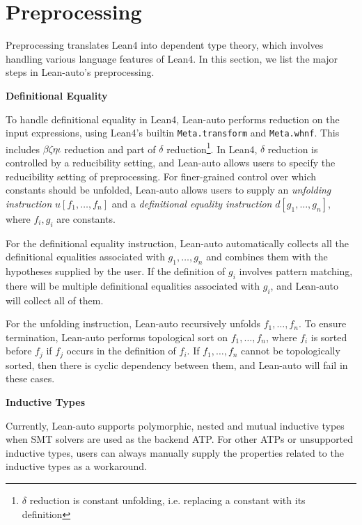\section{Preprocessing}\label{sectprep}

  Preprocessing translates Lean4 into dependent type theory, which involves
  handling various language features of Lean4. In this section, we list the major steps
  in Lean-auto's preprocessing.


\noindent \textbf{Definitional Equality}

  To handle definitional equality in Lean4, Lean-auto performs reduction on the input
  expressions, using Lean4's builtin \texttt{Meta.transform} and \texttt{Meta.whnf}.
  This includes $\beta \zeta \eta \iota$ reduction and part of $\delta$
  reduction\footnote{$\delta$ reduction is constant unfolding, i.e. replacing a constant with its definition}.
  In Lean4, $\delta$ reduction is controlled by a reducibility setting,
  and Lean-auto allows users to specify the reducibility setting of preprocessing.
  For finer-grained control over which constants should be unfolded, Lean-auto allows
  users to supply an \textit{unfolding instruction} $u[f_1, \dots, f_n]$ and a
  \textit{definitional equality instruction} $d[g_1, \dots, g_n]$, where $f_i, g_i$
  are constants.

  For the definitional equality instruction, Lean-auto automatically collects all the definitional
  equalities associated with $g_1, \dots, g_n$ and combines them with the hypotheses
  supplied by the user. If the definition of $g_i$ involves pattern matching,
  there will be multiple definitional equalities associated with $g_i$, and Lean-auto
  will collect all of them.

  For the unfolding instruction, Lean-auto recursively unfolds $f_1, \dots, f_n$.
  To ensure termination, Lean-auto performs topological sort on $f_1, \dots, f_n$,
  where $f_i$ is sorted before $f_j$ if $f_j$ occurs in the definition of $f_i$. If
  $f_1, \dots, f_n$ cannot be topologically sorted, then there is cyclic dependency
  between them, and Lean-auto will fail in these cases.

\noindent \textbf{Inductive Types}

  Currently, Lean-auto supports polymorphic, nested and mutual inductive types
  when SMT solvers are used as the backend ATP. For other ATPs or unsupported
  inductive types, users can always manually supply the properties related
  to the inductive types as a workaround.

